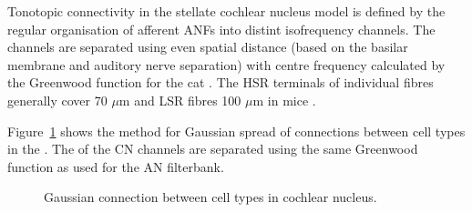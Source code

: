 Tonotopic connectivity in the stellate cochlear nucleus model is defined by the regular organisation of afferent ANFs into distint isofrequency channels. 
The channels are separated using even spatial distance (based on the basilar membrane and auditory nerve separation) with centre frequency calculated by the Greenwood function for the cat \citep[see \ref{tab:ModelSummary},]{Greenwood:1990}. 
The HSR terminals of individual fibres generally cover 70 $\mu$m and LSR fibres 100 $\mu$m in mice \citep{OertelWuEtAl:1988,OertelWu:1989}.  


Figure~\ref{fig:CNconn} shows the method for Gaussian spread of connections between cell types in the \CN.  
The \CF of the CN channels are separated using the same Greenwood function as used for the AN filterbank.








\begin{figure}[htb]
  \begin{center}
    \caption{Gaussian connection between cell types in cochlear nucleus.}
    \label{fig:CNconn}
  \end{center}
\end{figure}


